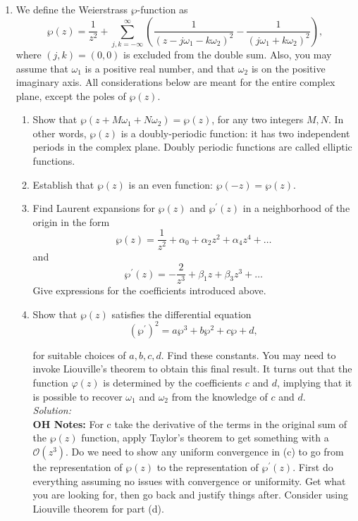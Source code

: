 \documentclass[10pt]{amsart}
\theoremstyle{nonumberplain}
\begin{document}
\begin{enumerate}[label={\bf {\arabic*}:}]
\item We define the Weierstrass $\wp$-function as
$$
\wp(z)=\frac{1}{z^2}+\sum_{j, k=-\infty}^{\infty}\left(\frac{1}{\left(z-j \omega_1-k \omega_2\right)^2}-\frac{1}{\left(j \omega_1+k \omega_2\right)^2}\right),
$$
where $(j, k)=(0,0)$ is excluded from the double sum. Also, you may
assume that $\omega_1$ is a positive real number, and that $\omega_2$
is on the positive imaginary axis. All considerations below are meant
for the entire complex plane, except the poles of $\wp(z)$.
\begin{enumerate}
\item Show that $\wp\left(z+M \omega_1+N \omega_2\right)=\wp(z)$, for any two integers $M, N$. In other words, $\wp(z)$ is a doubly-periodic function: it has two independent periods in the complex plane. Doubly periodic functions are called elliptic functions.
\item Establish that $\wp(z)$ is an even function: $\wp(-z)=\wp(z)$.
\item Find Laurent expansions for $\wp(z)$ and $\wp^{\prime}(z)$ in a neighborhood of the origin in the form
$$ \wp(z)=\frac{1}{z^2}+\alpha_0+\alpha_2 z^2+\alpha_4 z^4+\ldots $$
and
$$ \wp^{\prime}(z)=-\frac{2}{z^3}+\beta_1 z+\beta_3 z^3+\ldots $$
Give expressions for the coefficients introduced above.
\item Show that $\wp(z)$ satisfies the differential equation
$$ \left(\wp^{\prime}\right)^2=a \wp^3+b \wp^2+c \wp+d, $$

for suitable choices of $a, b, c, d$. Find these constants. You may need to invoke Liouville's theorem to obtain this final result. It turns out that the function $\varphi(z)$ is determined by the coefficients $c$ and $d$, implying that it is possible to recover $\omega_1$ and $\omega_2$ from the knowledge of $c$ and $d$. \\

\noindent
\textit{Solution:} \\
{\bf OH Notes: }
For c take the derivative of the terms in the original sum of the $\wp(z)$ function, apply Taylor's theorem to get something with a $\mathcal O(z^3)$.
Do we need to show any uniform convergence in (c) to go from the representation of $\wp(z)$ to the representation of $\wp^\prime(z)$.
First do everything assuming no issues with convergence or uniformity.
Get what you are looking for, then go back and justify things after.
Consider using Liouville theorem for part (d).

\end{enumerate}
\end{enumerate}
\end{document}
